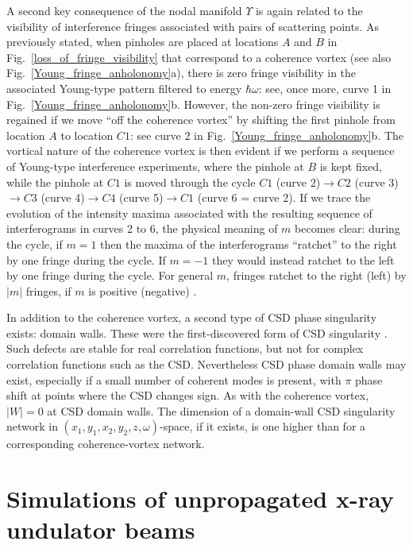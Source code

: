 \documentclass[%
 reprint,
 amsmath,amssymb,
 aps,
]{revtex4-1}
\begin{document}
A second key consequence of the nodal manifold $\Upsilon$ is again related to the visibility of interference fringes associated with pairs of scattering points.  As previously stated, when pinholes are placed at locations $A$ and $B$ in Fig.~\ref{loss_of_fringe_visibility} that correspond to a coherence vortex (see also Fig.~\ref{Young_fringe_anholonomy}a), there is zero fringe visibility in the associated Young-type pattern filtered to energy $\hbar \omega$: see, once more, curve 1 in Fig.~\ref{Young_fringe_anholonomy}b.  However, the non-zero fringe visibility is regained if we move ``off the coherence vortex'' by shifting the first pinhole from location $A$ to location $C1$: see curve 2 in Fig.~\ref{Young_fringe_anholonomy}b.  The vortical nature of the coherence vortex is then evident if we perform a sequence of Young-type interference experiments, where the pinhole at $B$ is kept fixed, while the pinhole at $C1$ is moved through the cycle $C1$ (curve 2)$\rightarrow C2$ (curve 3)$\rightarrow C3$ (curve 4)$\rightarrow C4$ (curve 5)$\rightarrow C1$ (curve 6 = curve 2). If we trace the evolution of the intensity maxima associated with the resulting sequence of interferograms in curves 2 to 6, the physical meaning of $m$ becomes clear: during the cycle, if $m=1$ then the maxima of the interferograms  ``ratchet'' to the right by one fringe during the cycle. If $m=-1$ they would instead ratchet to the left by one fringe during the cycle.  For general $m$, fringes  ratchet to the right (left) by $|m|$ fringes, if $m$ is positive (negative) \cite{Marasinghe2010}.

In addition to the coherence vortex, a second type of CSD phase singularity exists: domain walls.  These were the first-discovered form of CSD  singularity \cite{Schouten2003}.  Such defects are stable for real correlation functions, but not for complex correlation functions such as the CSD.  Nevertheless CSD phase domain walls may exist, especially if a small number of coherent modes is present, with $\pi$ phase shift at points where the CSD changes sign.  As with the coherence vortex, $|W|=0$ at CSD domain walls.  The dimension of a domain-wall CSD singularity network in $(x_1,y_1,x_2,y_2,z,\omega)$-space, if it exists, is one higher than for a corresponding coherence-vortex network.  

\section{Simulations of unpropagated x-ray undulator beams}
\end{document}
